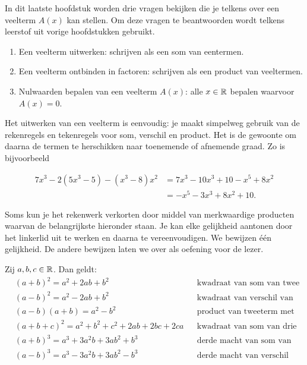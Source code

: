\documentclass{ximera}
\begin{document}
	\author{Koen de Naeghel - Wiskunde Op Maat}
    \xmsource





In dit laatste hoofdstuk worden drie vragen bekijken die je telkens over een veelterm \(A(x)\) kan stellen. 
Om deze vragen te beantwoorden wordt telkens leerstof uit vorige hoofdstukken gebruikt. 

\begin{enumerate}[(1)]
\item
Een veelterm uitwerken: schrijven als een som van eentermen. 
\item
Een veelterm ontbinden in factoren: schrijven als een product van veeltermen.
\item
Nulwaarden bepalen van een veelterm \(A(x)\): alle \(x \in \mathbb{R}\) bepalen waarvoor \(A(x) = 0\). 
\end{enumerate}




Het uitwerken van een veelterm is eenvoudig: je maakt simpelweg gebruik van de rekenregels en tekenregels voor som, verschil en product. Het is de gewoonte om daarna de termen te herschikken naar toenemende of afnemende graad. Zo is bijvoorbeeld

\begin{align*}
7x^3-2(5x^3-5)-(x^3-8)x^2 & = 7x^3 - 10x^3 + 10 - x^5 + 8x^2 \\
& = -x^5 - 3x^3 + 8x^2 + 10.
\end{align*}

Soms kun je het rekenwerk verkorten door middel van merkwaardige producten
waarvan de belangrijkste hieronder staan. Je kan elke gelijkheid aantonen door het linkerlid uit te werken en daarna te vereenvoudigen. We bewijzen één gelijkheid. De andere bewijzen laten we over als oefening voor de lezer. 

\begin{proposition} 
Zij \(a,b,c \in \mathbb{R}\). Dan geldt:
\begin{align*}
& (a+b)^2 = a^2+2ab+b^2 && \text{kwadraat van som van twee termen} \\
& (a-b)^2 = a^2-2ab+b^2 && \text{kwadraat van verschil van twee termen} \\
& (a-b)(a+b) = a^2-b^2 && \text{product van tweeterm met zijn toegevoegde} \\
& (a+b+c)^2 = a^2 + b^2 + c^2 + 2ab + 2bc + 2ca && \text{kwadraat van som van drie termen} \\
& (a+b)^3 = a^3+3a^2b+3ab^2+b^3 && \text{derde macht van som van twee termen} \\
& (a-b)^3 = a^3-3a^2b+3ab^2-b^3 && \text{derde macht van verschil van twee termen.}
\end{align*}
\end{proposition} 
\end{document}
